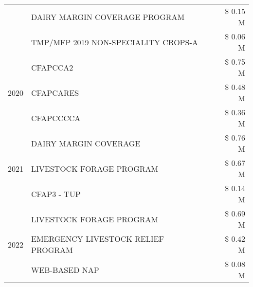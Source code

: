 \begin{tabular}{llr}
 & DAIRY MARGIN COVERAGE PROGRAM & \$ 0.15 M \\
 & TMP/MFP 2019 NON-SPECIALITY CROPS-A & \$ 0.06 M \\
\cline{1-3}
\multirow[t]{3}{*}{2020} & CFAPCCA2 & \$ 0.75 M \\
 & CFAPCARES & \$ 0.48 M \\
 & CFAPCCCCA & \$ 0.36 M \\
\cline{1-3}
\multirow[t]{3}{*}{2021} & DAIRY MARGIN COVERAGE & \$ 0.76 M \\
 & LIVESTOCK FORAGE PROGRAM & \$ 0.67 M \\
 & CFAP3 - TUP & \$ 0.14 M \\
\cline{1-3}
\multirow[t]{3}{*}{2022} & LIVESTOCK FORAGE PROGRAM & \$ 0.69 M \\
 & EMERGENCY LIVESTOCK RELIEF PROGRAM & \$ 0.42 M \\
 & WEB-BASED NAP & \$ 0.08 M \\
\cline{1-3}
\bottomrule
\end{tabular}
